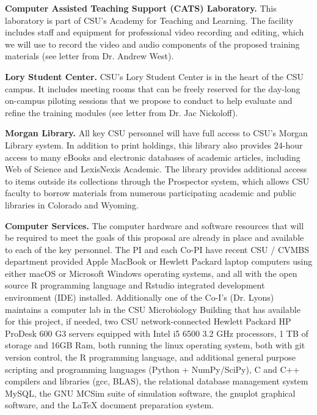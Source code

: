 \documentclass[pdftex,english,11.5pt,parskip=half]{scrartcl}
\begin{document}
\textbf{Computer Assisted Teaching Support (CATS) Laboratory.} This laboratory is part of CSU's Academy for Teaching and Learning. The facility includes staff and equipment for professional video recording and editing, which we will use to record the video and audio components of the proposed training materials (see letter from Dr. Andrew West). 

\textbf{Lory Student Center.} CSU's Lory Student Center is in the heart of the CSU campus. It includes meeting rooms that can be freely reserved for the day-long on-campus piloting sessions that we propose to conduct to help evaluate and refine the training modules (see letter from Dr. Jac Nickoloff).

\textbf{Morgan Library.} All key CSU personnel will have full access to CSU’s Morgan Library system. In addition to print holdings, this library also provides 24-hour access to many eBooks and electronic databases of academic articles, including Web of Science and LexisNexis Academic. The library provides additional access to items outside its collections through the Prospector system, which allows CSU faculty to borrow materials from numerous participating academic and public libraries in Colorado and Wyoming. 

\textbf{Computer Services.} The computer hardware and software resources that
will be required to meet the goals of this proposal are already in place and
available to each of the key personnel.  The PI and each Co-PI have recent CSU
/ CVMBS department provided Apple MacBook or Hewlett Packard laptop computers
using either macOS or Microsoft Windows operating systems, and all with the
open
source R programming language and Rstudio integrated development environment
(IDE) installed.  Additionally one of the Co-I's (Dr. Lyons) maintains a
computer lab in the CSU Microbiology Building that has available for this
project, if needed, two CSU network-connected Hewlett Packard HP ProDesk
600 G3 servers equipped with Intel i5 6500 3.2 GHz processors, 1 TB of
storage and 16GB Ram,  both running the linux operating system, both with
git version control, the R programming language, and additional
general purpose scripting and programming languages (Python + NumPy/SciPy),
C and C++ compilers and libraries (gcc, BLAS), the relational database
management system MySQL, the GNU MCSim suite of simulation software, the
gnuplot graphical software, and the LaTeX document preparation system.
\end{document}
